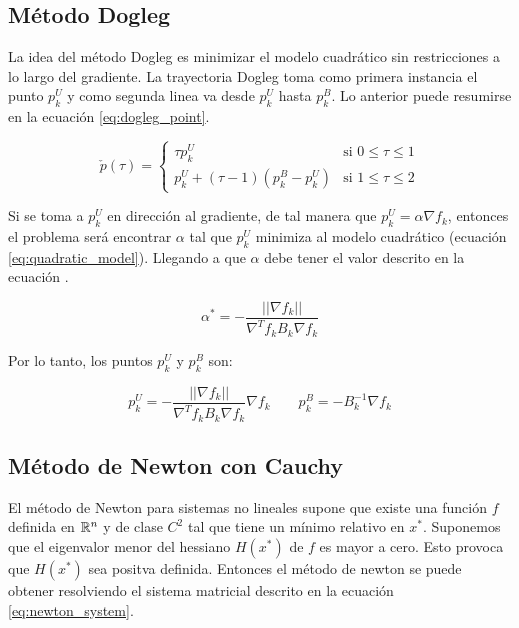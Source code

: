 \subsection{Método Dogleg \label{sec:dogleg}}

La idea del método Dogleg es minimizar el modelo cuadrático sin restricciones a lo largo del gradiente. La trayectoria Dogleg toma como primera instancia el punto $p_k^U$ y como segunda linea va desde $p_k^U$ hasta $p_k^B$. Lo anterior puede resumirse en la ecuación \ref{eq:dogleg_point}.

\begin{equation}
    \check{p}(\tau) = \left\{ \begin{matrix}
        \tau p_k^U                   & \text{si } 0 \leq \tau \leq 1 \\
        p_k^U+ (\tau-1)(p_k^B-p_k^U) & \text{si } 1 \leq \tau \leq 2
    \end{matrix} \right. \label{eq:dogleg_point}
\end{equation}

Si se toma a $p_k^U$ en dirección al gradiente, de tal manera que $p_k^U = \alpha \nabla f_k $, entonces el problema será encontrar $\alpha$ tal que $p_k^U$ minimiza al modelo cuadrático (ecuación \ref*{eq:quadratic_model}). Llegando a que $\alpha$ debe tener el valor descrito en la ecuación .

\begin{equation}
    \alpha^* = -\frac{||\nabla f_k||}{\nabla^T f_k B_k \nabla f_k}
\end{equation}

Por lo tanto, los puntos $p_k^U$ y $p_k^B$ son:

\begin{equation*}
    p_k^U = -\frac{||\nabla f_k||}{\nabla^T f_k B_k \nabla f_k} \nabla f_k \qquad p_k^B = -B_k^{-1}\nabla f_k
\end{equation*}

\subsection{Método de Newton con Cauchy}

El método de Newton para sistemas no lineales supone que existe una función $f$ definida en $\mathbb{R}^n$ y de clase $C^2$ tal que tiene un mínimo relativo en $x^*$. Suponemos que el eigenvalor menor del hessiano $H(x^*)$ de $f$ es mayor a cero. Esto provoca que $H(x^*)$ sea positva definida. Entonces el método de newton se puede obtener resolviendo el sistema matricial descrito en la ecuación \ref{eq:newton_system}.

